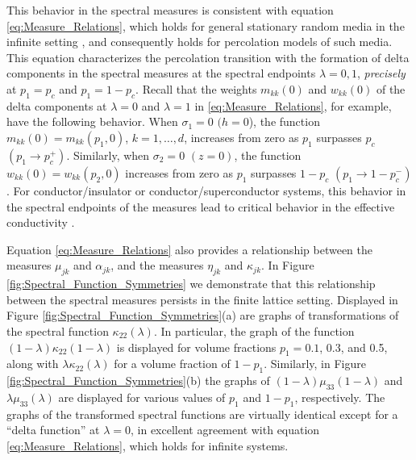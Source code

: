 \documentclass{cmslatex}
\begin{document}
This behavior in the spectral measures is consistent with equation
\eqref{eq:Measure_Relations}, which holds for general stationary
random media in the infinite setting \cite{Murphy:JMP:063506}, and
consequently holds for percolation models of such media. This equation
characterizes the percolation transition with the
formation of delta components in the spectral measures at the spectral
endpoints $\lambda=0,1$, \emph{precisely} at $p_1=p_c$ and
$p_1=1-p_c$. Recall that the weights $m_{kk}(0)$ and $w_{kk}(0)$ of
the delta components at $\lambda=0$ and $\lambda=1$ in
\eqref{eq:Measure_Relations}, for example, have the following
behavior. When $\sigma_1=0$ $(h=0$), the function
$m_{kk}(0)=m_{kk}(p_1,0)$, $k=1,\ldots,d$, increases from zero as 
$p_1$ surpasses $p_c$ $(p_1\to p_c^+)$. Similarly, when $\sigma_2=0$
$(z=0)$, the function 
$w_{kk}(0)=w_{kk}(p_2,0)$ increases from zero as $p_1$ surpasses
$1-p_c$ $(p_1\to1-p_c^-)$. For conductor/insulator or
conductor/superconductor systems, this behavior in the spectral
endpoints of the measures lead to critical behavior in the effective
conductivity \cite{Murphy:JMP:063506,Golden:JMP-5627}. 




Equation \eqref{eq:Measure_Relations} also provides a relationship
between the measures $\mu_{jk}$ and $\alpha_{jk}$, and the measures $\eta_{jk}$ and
$\kappa_{jk}$. In Figure \ref{fig:Spectral_Function_Symmetries} we
demonstrate that this relationship between the spectral measures
persists in the finite lattice setting. Displayed in Figure
\ref{fig:Spectral_Function_Symmetries}(a) are graphs of 
transformations of the spectral function $\kappa_{22}(\lambda)$. In particular,
the graph of the function $(1-\lambda)\kappa_{22}(1-\lambda)$ is displayed for
volume fractions $p_1=0.1$, 0.3, and 0.5, along with $\lambda\kappa_{22}(\lambda)$ for
a volume fraction of $1-p_1$. Similarly, in Figure
\ref{fig:Spectral_Function_Symmetries}(b) the graphs of
$(1-\lambda)\mu_{33}(1-\lambda)$ and $\lambda\mu_{33}(\lambda)$ are displayed for various values
of $p_1$ and $1-p_1$, respectively. The graphs of the 
transformed spectral functions are virtually identical except for a
``delta function'' at $\lambda=0$, in excellent agreement with equation
\eqref{eq:Measure_Relations}, which holds for infinite systems.
\end{document}
